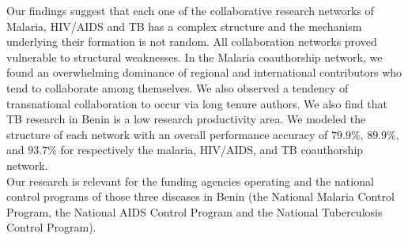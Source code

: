     Our findings suggest that each one of the collaborative research networks of Malaria, HIV/AIDS and TB has a complex structure and the mechanism underlying their formation is not random. All collaboration networks proved vulnerable to structural weaknesses. In the Malaria coauthorship network, we found an overwhelming dominance of regional and international contributors who tend to collaborate among themselves. We also observed a tendency of transnational collaboration to occur via long tenure authors. We also find that TB research in Benin is a low research productivity area. We modeled the structure of each network with an overall performance accuracy of $79.9\%$, $89.9\%$, and $93.7\%$ for respectively the malaria, HIV/AIDS, and TB coauthorship network. \\ 
    Our research is relevant for the funding agencies operating and the national control programs of those three diseases in Benin (the National Malaria Control Program, the National AIDS Control Program and the National Tuberculosis Control Program). %
